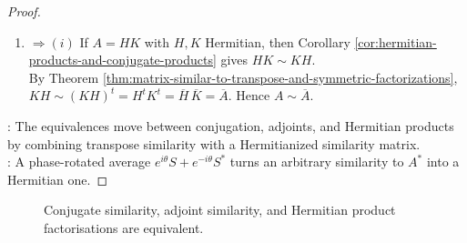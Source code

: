 \begin{theorem}
\begin{proof}
\begin{enumerate}[label=\roman*.]
\item[$(v)$]$\Rightarrow(i)$ If $A=HK$ with $H,K$ Hermitian, then Corollary \ref{cor:hermitian-products-and-conjugate-products} gives $HK\sim KH$.\\
By Theorem \ref{thm:matrix-similar-to-transpose-and-symmetric-factorizations}, $KH\sim (KH)^t=H^tK^t=\overline{H}\,\overline{K}=\overline{A}$. Hence $A\sim\overline{A}$.
\end{enumerate}
: The equivalences move between conjugation, adjoints, and Hermitian products by combining transpose similarity with a Hermitianized similarity matrix.\\
: A phase-rotated average $e^{i\theta}S+e^{-i\theta}S^*$ turns an arbitrary similarity to $A^*$ into a Hermitian one.
\end{proof}
\end{theorem}

\begin{figure}[H]
  \centering
  
  \caption{Conjugate similarity, adjoint similarity, and Hermitian product factorisations are equivalent.}
  \label{fig:conjugate-similarity-hermitian-products}
\end{figure}
